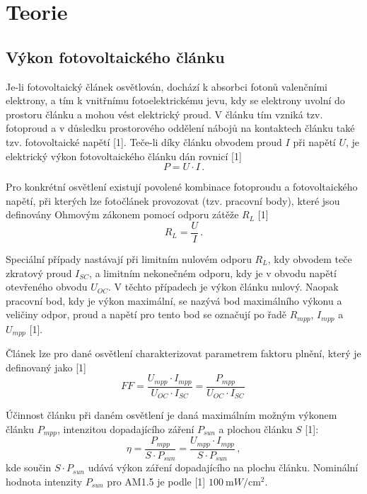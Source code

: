 \documentclass{../concepts/prepareprotokol} %
\begin{document}
\section{Teorie}
\subsection{Výkon fotovoltaického článku}

Je-li fotovoltaický článek osvětlován, dochází k absorbci fotonů valenčními elektrony, a tím k vnitřnímu fotoelektrickému jevu, kdy se elektrony uvolní do prostoru článku a mohou vést elektrický proud. V článku tím vzniká tzv. fotoproud a v důsledku prostorového oddělení nábojů na kontaktech článku také tzv. fotovoltaické napětí [1]. Teče-li díky článku obvodem proud $I$ při napětí $U$, je elektrický výkon fotovoltaického článku dán rovnicí [1]
\begin{equation} \label{eq:pui}
    P = U \cdot I \, .
\end{equation}

Pro konkrétní osvětlení existují povolené kombinace fotoproudu a fotovoltaického napětí, při kterých lze fotočlánek provozovat (tzv. pracovní body), které jsou definovány Ohmovým zákonem pomocí odporu zátěže $R_L$ [1]
\begin{equation} \label{eq:ohm}
    R_L = \frac{U}{I}  \, .
\end{equation}

Speciální případy nastávají při limitním nulovém odporu $R_L$, kdy obvodem teče zkratový proud $I_{SC}$, a limitním nekonečném odporu, kdy je v obvodu napětí otevřeného obvodu $U_{OC}$. V těchto případech je výkon článku nulový. Naopak pracovní bod, kdy je výkon maximální, se nazývá bod maximálního výkonu a veličiny odpor, proud a napětí pro tento bod se označují po řadě $R_{mpp}$, $I_{mpp}$ a $U_{mpp}$ [1].

Článek lze pro dané osvětlení charakterizovat parametrem faktoru plnění, který je definovaný jako [1]
\begin{equation} \label{eq:ff}
    FF = \frac{U_{mpp} \cdot I_{mpp}}{U_{OC} \cdot I_{SC}} = \frac{P_{mpp}}{U_{OC} \cdot I_{SC}} \,
\end{equation}

Účinnost článku při daném osvětlení je daná maximálním možným výkonem článku $P_{mpp}$, intenzitou dopadajícího záření $P_{sun}$ a plochou článku $S$ [1]:
\begin{equation} \label{eq:eta}
    \eta = \frac{P_{mpp}}{S \cdot P_{sun}} = \frac{U_{mpp} \cdot I_{mpp}}{S \cdot P_{sun}} \, ,
\end{equation}
kde součin $S \cdot P_{sun}$ udává výkon záření dopadajícího na plochu článku. Nominální hodnota intenzity $P_{sun}$ pro AM1.5 je podle [1] $\SI{100}{\milli W \per \centi\metre\squared}$.
\end{document}
